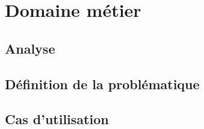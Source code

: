 
\chapter[Domaine métier]{Domaine métier}

\section[Analyse]{Analyse}

\section[Problématique]{Définition de la problématique}

\section[Use case]{Cas d'utilisation}